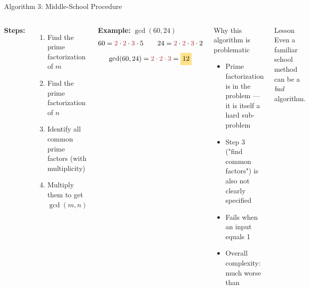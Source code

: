 \documentclass[aspectratio=169]{beamer}
\begin{document}
\begin{frame}[shrink=12]{Algorithm 3: Middle-School Procedure}
  \begin{columns}[T]
      \textbf{Steps:}
      \begin{enumerate}
        \item Find the prime factorization of $m$
        \item Find the prime factorization of $n$
        \item Identify all common prime factors (with multiplicity)
        \item Multiply them to get $\gcd(m,n)$
      \end{enumerate}
      \vspace{0.3em}
      \textbf{Example:} $\gcd(60,24)$
      \[
        60 = \textcolor{AlertRed}{2}\cdot\textcolor{AlertRed}{2}\cdot\textcolor{AlertRed}{3}\cdot 5
        \qquad
        24 = \textcolor{AlertRed}{2}\cdot\textcolor{AlertRed}{2}\cdot\textcolor{AlertRed}{3}\cdot 2
      \]
      \[
        \gcd(60,24)= \textcolor{AlertRed}{2\cdot 2\cdot 3} = \highlight{12}
      \]
      \begin{alertblock}{Why this algorithm is problematic}
        \begin{itemize}
          \item Prime factorization is  in the problem — it is itself
                a hard sub-problem
          \item Step 3 ("find common factors") is also not
                clearly specified
          \item Fails when an input equals 1
          \item Overall complexity: much worse than 
        \end{itemize}
      \end{alertblock}
      \begin{exampleblock}{Lesson}
        Even a familiar school method can be a \emph{bad} algorithm.
      \end{exampleblock}
  \end{columns}
\end{frame}
\end{document}
